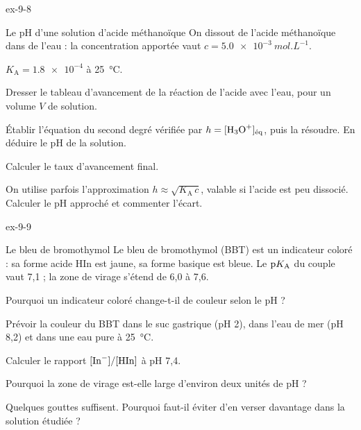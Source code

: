 \begin{blocLivre}{ex-9-8}
\begin{exercice}[2]{Le pH d'une solution d'acide méthanoïque}
On dissout de l'acide méthanoïque dans de l'eau : la concentration apportée vaut $c=\qty{5,0e-3}{mol.L^{-1}}$.
\begin{donnees}
$K_\mathrm{A}=\num{1.8e-4}$ à 25~°C.
\end{donnees}
\begin{questions}
\item Dresser le tableau d'avancement de la réaction de l'acide avec l'eau, pour un volume $V$ de solution.
\item {}Établir l'équation du second degré vérifiée par $h=[\ce{H3O+}]_\text{éq}$, puis
la résoudre. En déduire le pH de la solution.
\item Calculer le taux d'avancement final.
\item On utilise parfois l'approximation $h\approx\sqrt{K_\mathrm{A}\,c}$, valable si l'acide est peu dissocié.
Calculer le pH approché et commenter l'écart.
\end{questions}
\end{exercice}
\end{blocLivre}
\begin{blocLivre}{ex-9-9}
\begin{exercice}[2]{Le bleu de bromothymol}
Le bleu de bromothymol (BBT) est un indicateur coloré : sa forme acide HIn est jaune, sa forme basique  est
bleue. Le $\mathrm{p}K_{\mathrm{A}}$ du couple vaut 7,1 ; la zone de virage s'étend de 6,0 à 7,6.
\begin{questions}
\item Pourquoi un indicateur coloré change-t-il de couleur selon le pH ?
\item Prévoir la couleur du BBT dans le suc gastrique (pH 2), dans l'eau de mer (pH 8,2) et dans une eau pure à
25~°C.
\item Calculer le rapport $[\ce{In-}]/[\ce{HIn}]$ à pH 7,4.
\item Pourquoi la zone de virage est-elle large d'environ deux unités de pH ?
\item Quelques gouttes suffisent. Pourquoi faut-il éviter d'en verser davantage dans la solution étudiée ?
\end{questions}
\end{exercice}
\end{blocLivre}
